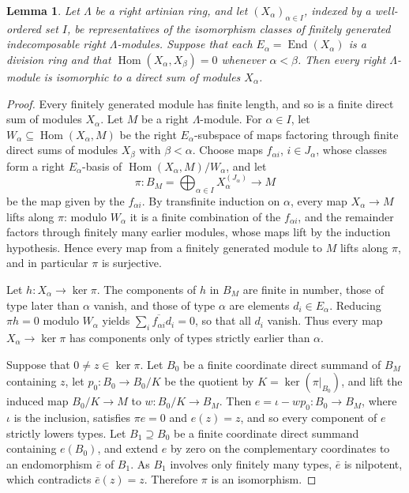 \documentclass[11pt,a4paper]{amsart}
\newtheorem{lemma}[theorem]{Lemma}
\numberwithin{equation}{section}
\newcommand{\Hom}{\operatorname{Hom}}
\newcommand{\End}{\operatorname{End}}
\begin{document}
\begin{lemma}\label{lem:decomp}
Let $\Lambda$ be a right artinian ring, and let $(X_\alpha)_{\alpha\in I}$, indexed by a well-ordered set $I$, be representatives of the isomorphism classes of finitely generated indecomposable right $\Lambda$-modules. Suppose that each $E_\alpha=\End(X_\alpha)$ is a division ring and that $\Hom(X_\alpha,X_\beta)=0$ whenever $\alpha<\beta$. Then every right $\Lambda$-module is isomorphic to a direct sum of modules $X_\alpha$.
\end{lemma}

\begin{proof}
Every finitely generated module has finite length, and so is a finite direct sum of modules $X_\alpha$. Let $M$ be a right $\Lambda$-module. For $\alpha\in I$, let $W_\alpha\subseteq\Hom(X_\alpha,M)$ be the right $E_\alpha$-subspace of maps factoring through finite direct sums of modules $X_\beta$ with $\beta<\alpha$. Choose maps $f_{\alpha i}$, $i\in J_\alpha$, whose classes form a right $E_\alpha$-basis of $\Hom(X_\alpha,M)/W_\alpha$, and let
\[
\pi\colon B_M=\textstyle\bigoplus_{\alpha\in I}X_\alpha^{(J_\alpha)}\to M
\]
be the map given by the $f_{\alpha i}$. By transfinite induction on $\alpha$, every map $X_\alpha\to M$ lifts along $\pi$: modulo $W_\alpha$ it is a finite combination of the $f_{\alpha i}$, and the remainder factors through finitely many earlier modules, whose maps lift by the induction hypothesis. Hence every map from a finitely generated module to $M$ lifts along $\pi$, and in particular $\pi$ is surjective.

Let $h\colon X_\alpha\to\ker\pi$. The components of $h$ in $B_M$ are finite in number, those of type later than $\alpha$ vanish, and those of type $\alpha$ are elements $d_i\in E_\alpha$. Reducing $\pi h=0$ modulo $W_\alpha$ yields $\sum_i\overline{f_{\alpha i}}d_i=0$, so that all $d_i$ vanish. Thus every map $X_\alpha\to\ker\pi$ has components only of types strictly earlier than $\alpha$.

Suppose that $0\ne z\in\ker\pi$. Let $B_0$ be a finite coordinate direct summand of $B_M$ containing $z$, let $p_0\colon B_0\to B_0/K$ be the quotient by $K=\ker(\pi|_{B_0})$, and lift the induced map $B_0/K\to M$ to $w\colon B_0/K\to B_M$. Then $e=\iota-wp_0\colon B_0\to B_M$, where $\iota$ is the inclusion, satisfies $\pi e=0$ and $e(z)=z$, and so every component of $e$ strictly lowers types. Let $B_1\supseteq B_0$ be a finite coordinate direct summand containing $e(B_0)$, and extend $e$ by zero on the complementary coordinates to an endomorphism $\bar e$ of $B_1$. As $B_1$ involves only finitely many types, $\bar e$ is nilpotent, which contradicts $\bar e(z)=z$. Therefore $\pi$ is an isomorphism.
\end{proof}
\end{document}
